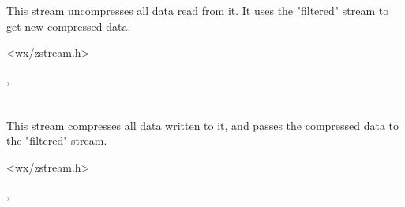 \section{}\label{wxzlibinputstream}

This stream uncompresses all data read from it. It uses the "filtered"
stream to get new compressed data.




<wx/zstream.h>


, 

\section{}\label{wxzliboutputstream}

This stream compresses all data written to it, and passes the compressed data
to the "filtered" stream.




<wx/zstream.h>


, 

